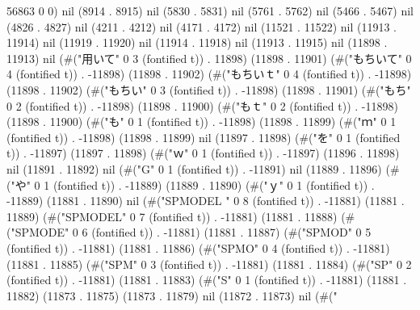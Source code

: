 56863 0 0) nil (8914 . 8915) nil (5830 . 5831) nil (5761 . 5762) nil (5466 . 5467) nil (4826 . 4827) nil (4211 . 4212) nil (4171 . 4172) nil (11521 . 11522) nil (11913 . 11914) nil (11919 . 11920) nil (11914 . 11918) nil (11913 . 11915) nil (11898 . 11913) nil (#("用いて" 0 3 (fontified t)) . 11898) (11898 . 11901) (#("もちいて" 0 4 (fontified t)) . -11898) (11898 . 11902) (#("もちいｔ" 0 4 (fontified t)) . -11898) (11898 . 11902) (#("もちい" 0 3 (fontified t)) . -11898) (11898 . 11901) (#("もち" 0 2 (fontified t)) . -11898) (11898 . 11900) (#("もｔ" 0 2 (fontified t)) . -11898) (11898 . 11900) (#("も" 0 1 (fontified t)) . -11898) (11898 . 11899) (#("ｍ" 0 1 (fontified t)) . -11898) (11898 . 11899) nil (11897 . 11898) (#("を" 0 1 (fontified t)) . -11897) (11897 . 11898) (#("ｗ" 0 1 (fontified t)) . -11897) (11896 . 11898) nil (11891 . 11892) nil (#("G" 0 1 (fontified t)) . -11891) nil (11889 . 11896) (#("や" 0 1 (fontified t)) . -11889) (11889 . 11890) (#("ｙ" 0 1 (fontified t)) . -11889) (11881 . 11890) nil (#("SPMODEL " 0 8 (fontified t)) . -11881) (11881 . 11889) (#("SPMODEL" 0 7 (fontified t)) . -11881) (11881 . 11888) (#("SPMODE" 0 6 (fontified t)) . -11881) (11881 . 11887) (#("SPMOD" 0 5 (fontified t)) . -11881) (11881 . 11886) (#("SPMO" 0 4 (fontified t)) . -11881) (11881 . 11885) (#("SPM" 0 3 (fontified t)) . -11881) (11881 . 11884) (#("SP" 0 2 (fontified t)) . -11881) (11881 . 11883) (#("S" 0 1 (fontified t)) . -11881) (11881 . 11882) (11873 . 11875) (11873 . 11879) nil (11872 . 11873) nil (#("
